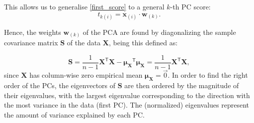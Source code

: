 This allows us to generalise \eqref{first_score} to a general $k$-th PC score:
\begin{equation}
t_{k(i)} = \mathbf{x}_{(i)} \cdot \mathbf{w}_{(k)}.\label{score}
\end{equation}







Hence, the weights $\mathbf{w}_{(k)}$ of the PCA are found by diagonalizing the sample covariance matrix $\mathbf{S}$ of the data $\mathbf{X}$, being this defined as:

\begin{equation}
\mathbf{S} =  \frac{1}{n-1} \mathbf{X}^{\mathsf{T}} \mathbf{X} -  \mathbf{\mu_X}^{\mathsf{T}}\mathbf{\mu_X}= \frac{1}{n-1} \mathbf{X}^{\mathsf{T}} \mathbf{X},
\end{equation}
since $\mathbf{X}$ has column-wise zero empirical mean $\mathbf{\mu_X}=\vec{0}$. 
In order to find the right order of the PCs, the eigenvectors of $\mathbf{S}$ are then ordered by the magnitude of their eigenvalues, with the largest eigenvalue corresponding to the direction with the most variance in the data (first PC). The (normalized) eigenvalues represent the amount of variance explained by each PC.



